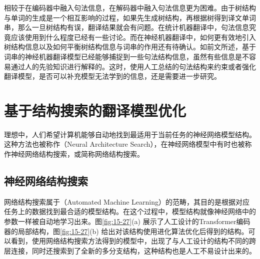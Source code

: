 \parinterval 相较于在编码器中融入句法信息，在解码器中融入句法信息更为困难。由于树结构与单词的生成是一个相互影响的过程，如果先生成树结构，再根据树得到译文单词串，那么一旦树结构有误，翻译结果就会有问题。在统计机器翻译中，句法信息究竟应该使用到什么程度已经有一些讨论。而在神经机器翻译中，如何更有效地引入树结构信息以及如何平衡树结构信息与词串的作用还有待确认。如前文所述，基于词串的神经机器翻译模型已经能够捕捉到一些句法结构信息，虽然有些信息是不容易通过人的先验知识进行解释的。这时，使用人工总结的句法结构来约束或者强化翻译模型，是否可以补充模型无法学到的信息，还是需要进一步研究。


\sectionnewpage
\section{基于结构搜索的翻译模型优化}

\parinterval 理想中，人们希望计算机能够自动地找到最适用于当前任务的神经网络模型结构。这种方法也被称作{\small{}}（Neural Architecture Search），在神经网络模型中有时也被称作神经网络结构搜索，或简称网络结构搜索。


\subsection{神经网络结构搜索}

\parinterval 网络结构搜索属于{\small{}}（Automated Machine Learning）的范畴，其目的是根据对应任务上的数据找到最合适的模型结构。在这个过程中，模型结构就像神经网络中的参数一样被自动地学习出来。图\ref{fig:15-27}(a) 展示了人工设计的Transformer编码器的局部结构，图\ref{fig:15-27}(b) 给出对该结构使用进化算法优化后得到的结构。可以看到，使用网络结构搜索方法得到的模型中，出现了与人工设计的结构不同的跨层连接，同时还搜索到了全新的多分支结构，这种结构也是人工不易设计出来的。

